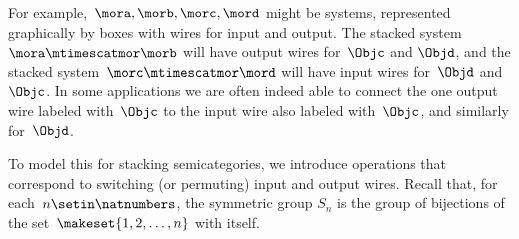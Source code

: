 For example,~$\mora, \morb, \morc, \mord$ might be systems, represented graphically by boxes with wires for input and output.
The stacked system~$\mora \mtimescatmor \morb$ will have output wires for~$\Objc$ and $\Objd$, and the stacked system~$\morc \mtimescatmor \mord$ will have input wires for~$\Objd$ and~$\Objc$.
In some applications we are often indeed able to connect the one output wire labeled with~$\Objc$ to the input wire also labeled with~$\Objc$, and similarly for~$\Objd$.

To model this for stacking semicategories, we introduce operations that correspond to switching (or permuting) input and output wires.
Recall that, for each~$n \setin \natnumbers$, the symmetric group $S_n$ is the group of bijections of the set~$\makeset{1, 2, \ldots, n }$ with itself.


